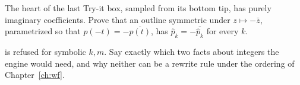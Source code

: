 \begin{exercisebox}
  The heart of the last Try-it box, sampled from its bottom tip, has purely imaginary
  coefficients. Prove that an outline symmetric under $z \mapsto -\bar z$, parametrized so that
  $p(-t) = -\overline{p(t)}$, has $\hat p_k = -\overline{\hat p_k}$ for every $k$.
\end{exercisebox}

\begin{exercisebox}
   is refused for symbolic $k, m$. Say exactly
  which two facts about integers the engine would need, and why neither can be a rewrite rule
  under the ordering of Chapter~\ref{ch:wf}.
\end{exercisebox}
